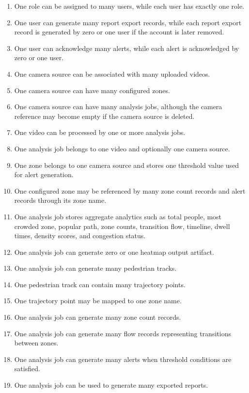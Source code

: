 \documentclass[12pt,a4paper]{report}
\begin{document}
\begin{enumerate}
    \item One role can be assigned to many users, while each user has exactly one role.
    \item One user can generate many report export records, while each report export record is generated by zero or one user if the account is later removed.
    \item One user can acknowledge many alerts, while each alert is acknowledged by zero or one user.
    \item One camera source can be associated with many uploaded videos.
    \item One camera source can have many configured zones.
    \item One camera source can have many analysis jobs, although the camera reference may become empty if the camera source is deleted.
    \item One video can be processed by one or more analysis jobs.
    \item One analysis job belongs to one video and optionally one camera source.
    \item One zone belongs to one camera source and stores one threshold value used for alert generation.
    \item One configured zone may be referenced by many zone count records and alert records through its zone name.
    \item One analysis job stores aggregate analytics such as total people, most crowded zone, popular path, zone counts, transition flow, timeline, dwell times, density scores, and congestion status.
    \item One analysis job can generate zero or one heatmap output artifact.
    \item One analysis job can generate many pedestrian tracks.
    \item One pedestrian track can contain many trajectory points.
    \item One trajectory point may be mapped to one zone name.
    \item One analysis job can generate many zone count records.
    \item One analysis job can generate many flow records representing transitions between zones.
    \item One analysis job can generate many alerts when threshold conditions are satisfied.
    \item One analysis job can be used to generate many exported reports.
\end{enumerate}
\end{document}
